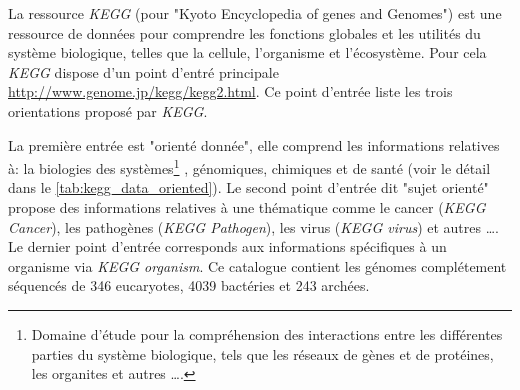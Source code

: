 \begin{refsegment}
    La ressource \textit{KEGG} (pour "Kyoto Encyclopedia of genes and Genomes") \cite{ogata1999kegg,kanehisa2000kegg,kanehisa2002kegg,kanehisa2004kegg,aoki2005using,kanehisa2010kegg,kanehisa2017kegg} est une ressource de données pour comprendre les fonctions globales et les utilités du système biologique, telles que la cellule, l'organisme et l'écosystème. Pour cela \textit{KEGG} dispose d'un point d'entré principale \url{http://www.genome.jp/kegg/kegg2.html}. Ce point d'entrée liste les trois orientations proposé par \textit{KEGG}.
    
    La première entrée est "orienté donnée", elle comprend les informations relatives à: la biologies des systèmes\footnote{Domaine d'étude pour la compréhension des interactions entre les différentes parties du système biologique, tels que les réseaux de gènes et de protéines, les organites et autres \ldots. } , génomiques, chimiques et de santé (voir le détail dans le \cref{tab:kegg_data_oriented}). Le second point d'entrée dit "sujet orienté" propose des informations relatives à une thématique comme le cancer (\textit{KEGG Cancer}), les pathogènes (\textit{KEGG Pathogen}), les virus (\textit{KEGG virus}) et autres \ldots. Le dernier point d'entrée corresponds aux informations spécifiques à un organisme via \textit{KEGG organism}. Ce catalogue contient les génomes complétement séquencés de 346 eucaryotes, 4039 bactéries et 243 archées.  
    

\end{refsegment}
